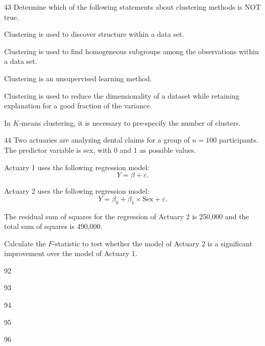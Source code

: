 \begin{question}{43}
Determine which of the following statements about clustering methods is NOT true.

\begin{choices}
\item Clustering is used to discover structure within a data set.
\item Clustering is used to find homogeneous subgroups among the observations within a data set.
\item Clustering is an unsupervised learning method.
\item Clustering is used to reduce the dimensionality of a dataset while retaining explanation for a good fraction of the variance.
\item In $K$-means clustering, it is necessary to pre-specify the number of clusters.
\end{choices}
\end{question}
\begin{question}{44}
Two actuaries are analyzing dental claims for a group of $n = 100$ participants. The predictor variable is sex, with 0 and 1 as possible values.

Actuary 1 uses the following regression model:
\[ Y = \beta + \varepsilon. \]

Actuary 2 uses the following regression model:
\[ Y = \beta_0 + \beta_1 \times \text{Sex} + \varepsilon. \]

The residual sum of squares for the regression of Actuary 2 is 250,000 and the total sum of squares is 490,000.

Calculate the $F$-statistic to test whether the model of Actuary 2 is a significant improvement over the model of Actuary 1.

\begin{choices}
\item 92
\item 93
\item 94
\item 95
\item 96
\end{choices}
\end{question}

